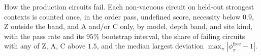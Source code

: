 
\begin{table}[tbp]
\centering
\scriptsize
\caption{How the production circuits fail.
Each non-vacuous circuit on held-out strongest contexts is counted once, in the order pass, undefined score, necessity below $0.9$, Z outside the band, and A and/or C only, by model, depth band, and site kind, with the pass rate and its $95\%$ bootstrap interval, the share of failing circuits with any of Z, A, C above $1.5$, and the median largest deviation $\max_{\pi} |\phi^{\mathrm{free}}_{\pi} - 1|$.}
\label{tab:run2026-anatomy}
\end{table}
